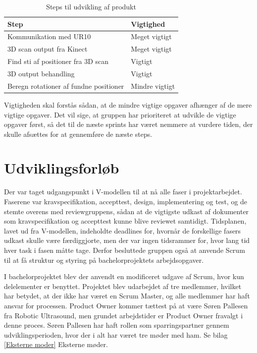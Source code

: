 \begin{table}[h]
\centering
\begin{tabular}{|l| p{}|}
\hline
\textbf{Step} &  \textbf{Vigtighed} \\\hline
	Kommunikation med UR10 & Meget vigtigt \\\hline
	3D scan output fra Kinect & Meget vigtigt\\\hline
	Find sti af positioner fra 3D scan & Vigtigt \\\hline
	3D output behandling & Vigtigt \\\hline
	Beregn rotationer af fundne positioner & Mindre vigtigt \\\hline
\end{tabular}
\caption{Steps til udvikling af produkt}
\end{table}

Vigtigheden skal forstås sådan, at de mindre vigtige opgaver afhænger af de mere vigtige opgaver. 
Det vil sige, at gruppen har prioriteret at udvikle de vigtige opgaver først, så det til de næste sprints har været nemmere at vurdere tiden, der skulle afsættes for at gennemføre de næste steps.
 
\section{Udviklingsforløb} \label{Udviklingsforlob}
Der var taget udgangspunkt i V-modellen til at nå alle faser i projektarbejdet. Faserene var kravspecifikation, accepttest, design, implementering og test, og de stemte overens med reviewgruppens, sådan at de vigtigste udkast af dokumenter som kravspecifikation og accepttest kunne blive reviewet samtidigt. Tidsplanen, lavet ud fra V-modellen, indeholdte deadlines for, hvornår de forskellige fasers udkast skulle være færdiggjorte, men der var ingen tidsrammer for, hvor lang tid hver task i fasen måtte tage. Derfor besluttede gruppen også at anvende Scrum til at få struktur og styring på bachelorprojektets arbejdsopgaver.

I bachelorprojektet blev der anvendt en modificeret udgave af Scrum, hvor kun delelementer er benyttet. Projektet blev udarbejdet af tre medlemmer, hvilket har betydet, at der ikke har været en Scrum Master, og alle medlemmer har haft ansvar for processen. Product Owner kommer tættest på at være Søren Pallesen fra Robotic Ultrasound, men grundet arbejdstider er Product Owner fravalgt i denne proces. Søren Pallesen har haft rollen som sparringspartner gennem udviklingsperioden, hvor der i alt har været tre møder med ham. Se bilag \ref{Eksterne moder} Eksterne møder. 

